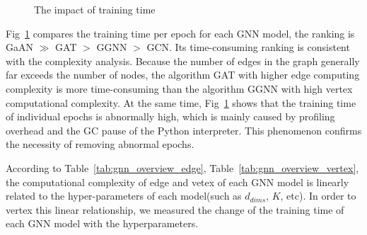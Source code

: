\begin{figure}
    \caption{The impact of training time}
	\label{fig:exp_absolute_training_time}
\end{figure}

Fig~\ref{fig:exp_absolute_training_time} compares the training time per epoch for each GNN model, the ranking is GaAN $\gg$ GAT $>$ GGNN $>$ GCN.
Its time-consuming ranking is consistent with the complexity analysis. Because the number of edges in the graph generally far exceeds the number of nodes, 
the algorithm GAT with higher edge computing complexity is more time-consuming than the algorithm GGNN with high vertex computational complexity. At the same time, 
Fig~\ref{fig:exp_absolute_training_time} shows that the training time of individual epochs is abnormally high, which is mainly caused by profiling overhead and the GC pause of the Python interpreter.
This phenomenon confirms the necessity of removing abnormal epochs.

According to Table~\ref{tab:gnn_overview_edge}, Table~\ref{tab:gnn_overview_vertex}, the computational complexity of edge and vetex of each GNN model is linearly related to the 
hyper-parameters of each model(such as $d_{dims}$, $K$, etc). In order to vertex this linear relationship, we measured the change of the training time of each GNN model with the hyperparameters.


